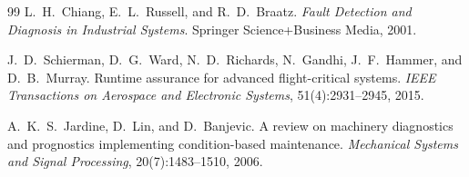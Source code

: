 \documentclass{llncs}
\begin{document}
\begin{thebibliography}{99}
L.~H.~Chiang, E.~L.~Russell, and R.~D.~Braatz.
\textit{Fault Detection and Diagnosis in Industrial Systems}.
Springer Science+Business Media, 2001.

J.~D.~Schierman, D.~G.~Ward, N.~D.~Richards, N.~Gandhi, J.~F.~Hammer,
and D.~B.~Murray.
Runtime assurance for advanced flight-critical systems.
\textit{IEEE Transactions on Aerospace and Electronic Systems},
51(4):2931--2945, 2015.

A.~K.~S.~Jardine, D.~Lin, and D.~Banjevic.
A review on machinery diagnostics and prognostics implementing
condition-based maintenance.
\textit{Mechanical Systems and Signal Processing}, 20(7):1483--1510, 2006.

\end{thebibliography}
\end{document}
